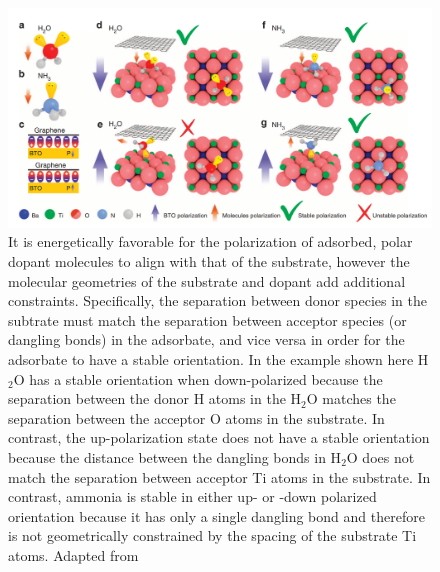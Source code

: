 \documentclass[edeposit,fullpage,draftthesis]{uiucthesis2009}
\begin{document}
            \begin{figure}
            \centering
            \includegraphics[width=\textwidth]{images/background/ferro_polar_doping.png}
            \caption[Dynamics of polar dopants on ferroelectric substrates]{
            It is energetically favorable for the polarization of adsorbed, polar dopant molecules to align with
            that of the substrate, however the molecular geometries of the substrate and dopant add
            additional constraints. Specifically, the separation between donor species in the subtrate
            must match the separation between acceptor species (or dangling bonds) in the adsorbate, and
            vice versa in order for the adsorbate to have a stable orientation. In the example shown here
            H$_2$O has a stable orientation when down-polarized because the separation between the donor H atoms in
            the H$_2$O matches the separation between the acceptor O atoms in the substrate. In contrast,
            the up-polarization state does not have a stable orientation because the distance between the
            dangling bonds in H$_2$O does not match the separation between acceptor Ti atoms in the substrate.
            In contrast, ammonia is stable in either up- or -down polarized orientation because it has only
            a single dangling bond and therefore is not geometrically constrained by the spacing of the substrate Ti atoms.
            Adapted from \cite{Lu2014}
            }
            \label{fig:polar_ferro}
            \end{figure}
        
        
       
        
\end{document}
